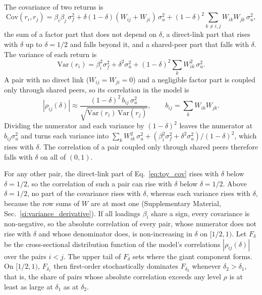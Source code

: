 \documentclass[a4paper,fleqn]{cas-sc}
\begin{document}
The covariance of two returns is
\begin{equation}\label{eq:toy_cov}
  \mathrm{Cov}(r_i, r_j) = \beta_i\beta_j\,\sigma_f^2 + \delta(1-\delta)(W_{ij}+W_{ji})\,\sigma_u^2 + (1-\delta)^2 \sum_{k\neq i,j} W_{ik}W_{jk}\,\sigma_u^2 ,
\end{equation}
the sum of a factor part that does not depend on $\delta$, a direct-link part that rises with $\delta$ up to $\delta = 1/2$ and falls beyond it, and a shared-peer part that falls with $\delta$. The variance of each return is
\begin{equation}\label{eq:toy_var}
  \mathrm{Var}(r_i) = \beta_i^2\sigma_f^2 + \delta^2\sigma_u^2 + (1-\delta)^2\sum_k W_{ik}^2\,\sigma_u^2 .
\end{equation}
A pair with no direct link ($W_{ij}=W_{ji}=0$) and a negligible factor part is coupled only through shared peers, so its correlation in the model is
\begin{equation}\label{eq:toy_bulk}
  |\rho_{ij}(\delta)| \approx \frac{(1-\delta)^2 \, b_{ij}\,\sigma_u^2}{\sqrt{\mathrm{Var}(r_i)\,\mathrm{Var}(r_j)}}, \qquad b_{ij} = \sum_{k} W_{ik}W_{jk}.
\end{equation}
Dividing the numerator and each variance by $(1-\delta)^2$ leaves the numerator at $b_{ij}\sigma_u^2$ and turns each variance into $\sum_k W_{ik}^2\,\sigma_u^2 + (\beta_i^2\sigma_f^2 + \delta^2\sigma_u^2)/(1-\delta)^2$, which rises with $\delta$. The correlation of a pair coupled only through shared peers therefore falls with $\delta$ on all of $(0,1)$.

For any other pair, the direct-link part of Eq.~\eqref{eq:toy_cov} rises with $\delta$ below $\delta = 1/2$, so the correlation of such a pair can rise with $\delta$ below $\delta = 1/2$. Above $\delta = 1/2$, no part of the covariance rises with $\delta$, whereas each variance rises with $\delta$, because the row sums of $W$ are at most one (Supplementary Material, Sec.~\ref{si:variance_derivative}). If all loadings $\beta_i$ share a sign, every covariance is non-negative, so the absolute correlation of every pair, whose numerator does not rise with $\delta$ and whose denominator does, is non-increasing in $\delta$ on $[1/2, 1)$. Let $F_\delta$ be the cross-sectional distribution function of the model's correlations $|\rho_{ij}(\delta)|$ over the pairs $i<j$. The upper tail of $F_\delta$ sets where the giant component forms. On $[1/2,1)$, $F_{\delta_1}$ then first-order stochastically dominates $F_{\delta_2}$ whenever $\delta_2 > \delta_1$, that is, the share of pairs whose absolute correlation exceeds any level $\rho$ is at least as large at $\delta_1$ as at $\delta_2$.
\end{document}
